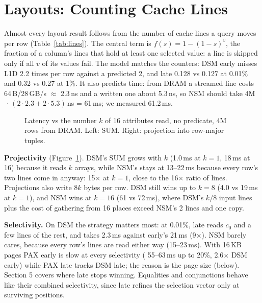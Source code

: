 \section{Layouts: Counting Cache Lines}
Almost every layout result follows from the number of cache lines a query moves per row
(Table~\ref{tab:lines}). The central term is $f(s) = 1-(1-s)^v$, the fraction of a column's
lines that hold at least one selected value: a line is skipped only if all $v$ of its values
fail. The model matches the counters: DSM early misses L1D 2.2 times per row against a predicted
2, and late 0.128 vs 0.127 at 0.01\% and 0.32 vs 0.27 at 1\%. It also predicts time: from DRAM a
streamed line costs 64\,B/28\,GB/s $\approx$ 2.3\,ns and a written one about 5.3\,ns, so NSM
 should take 4M$\,\cdot\,(2\cdot 2.3 + 2\cdot 5.3)$\,ns = 61\,ms; we measured
61.2\,ms.

\begin{figure}[t]
\centering
{}
\caption{Latency vs the number $k$ of 16 attributes read, no predicate, 4M rows from DRAM. Left:
SUM. Right: projection into row-major tuples.}
\label{fig:projectivity}
\end{figure}

\textbf{Projectivity} (Figure~\ref{fig:projectivity}). DSM's SUM grows with $k$ (1.0\,ms at
$k{=}1$, 18\,ms at 16) because it reads $k$ arrays, while NSM's stays at 13--22\,ms because
every row's two lines come in anyway: 15$\times$ at $k{=}1$, close to the 16$\times$ ratio of
lines. Projections also write $8k$ bytes per row. DSM still wins up to $k{=}8$ (4.0 vs 19\,ms at
$k{=}1$), and NSM wins at $k{=}16$ (61 vs 72\,ms), where DSM's $k/8$ input lines plus the cost of
gathering from 16 places exceed NSM's 2 lines and one copy.

\textbf{Selectivity.} On DSM the strategy matters most: at 0.01\%, late reads $c_0$ and a few
lines of the rest, and  takes 2.3\,ms against early's 21\,ms (9$\times$). NSM
barely cares, because every row's lines are read either way (15--23\,ms). With 16\,KB pages PAX
early is slow at every selectivity ( 55--63\,ms up to 20\%, 2.6$\times$ DSM
early) while PAX late tracks DSM late; the reason is the page size (below). Section 5 covers
where late stops winning. Equalities and conjunctions behave like their combined selectivity,
since late refines the selection vector only at surviving positions.

